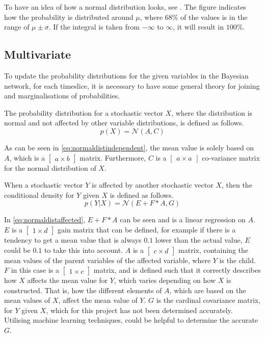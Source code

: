 To have an idea of how a normal distribution looks, see . The figure indicates how the probability is distributed around $\mu$, where $68\%$ of the values is in the range of $\mu \pm \sigma$.
If the integral is taken from $-\infty$ to $\infty$, it will result in $100\%$.

\subsection{Multivariate}
To update the probability distributions for the given variables in the Bayesian network, for each timeslice, it is necessary to have some general theory for joining and marginalisations of probabilities.

The probability distribution for a stochastic vector $X$, where the distribution is normal and not affected by other variable distributions, is defined as follows.
\begin{equation}\label{eq:normaldistindependent}
p(X)=\mathcal{N}(A, C)
\end{equation}

As can be seen in \eqref{eq:normaldistindependent}, the mean value is solely based on $A$, which is a $\begin{bmatrix}a \times b\end{bmatrix}$ matrix.
Furthermore, $C$ is a $\begin{bmatrix}a \times a\end{bmatrix}$ co-variance matrix for the normal distribution of $X$. 

When a stochastic vector $Y$ is affected by another stochastic vector $X$, then the conditional density for $Y$ given $X$ is defined as follows. 
\begin{equation}\label{eq:normaldistaffected}
p(Y|X)=\mathcal{N}(E + F * A, G)
\end{equation}

In \eqref{eq:normaldistaffected}, $E + F * A$ can be seen and is a linear regression on $A$.
$E$ is a $\begin{bmatrix}1 \times d\end{bmatrix}$ gain matrix that can be defined, for example if there is a tendency to get a mean value that is always $0.1$ lower than the actual value, $E$ could be $0.1$ to take this into account.
$A$ is a $\begin{bmatrix}c \times d \end{bmatrix}$ matrix, containing the mean values of the parent variables of the affected variable, where $Y$ is the child.
$F$ in this case is a $\begin{bmatrix}1 \times c\end{bmatrix}$ matrix, and is defined such that it correctly describes how $X$ affects the mean value for $Y$, which varies depending on how $X$ is constructed. 
That is, how the different elements of $A$, which are based on the mean values of $X$, affect the mean value of $Y$.
$G$ is the cardinal covariance matrix, for $Y$ given $X$, which for this project has not been determined accurately.
Utilising machine learning techniques, could be helpful to determine the accurate $G$. 

